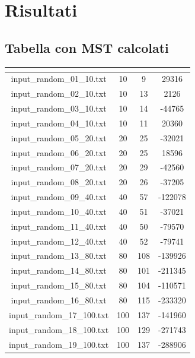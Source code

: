 \section{Risultati}

\subsection{Tabella con MST calcolati}
	
	\renewcommand{\arraystretch}{1.5}
	\begin{longtable}{|c|c|c|c|}
		\hline
		\rowcolor{title_row}
		\textbf{\color{title_text}{Input file}} &
		\textbf{\color{title_text}{num\_vertici}} & \textbf{\color{title_text}{num\_archi}} & \textbf{\color{title_text}{MST}}\\
		\hline
		\endhead
		input\_random\_01\_10.txt & 10 & 9 & 29316 \\ \hline 
		input\_random\_02\_10.txt & 10 & 13 & 2126 \\ \hline 
		input\_random\_03\_10.txt & 10 & 14 & -44765 \\ \hline
		input\_random\_04\_10.txt & 10 & 11 & 20360 \\ \hline
		input\_random\_05\_20.txt & 20 & 25 & -32021 \\ \hline
		input\_random\_06\_20.txt & 20 & 25 & 18596 \\ \hline
		input\_random\_07\_20.txt & 20 & 29 & -42560 \\ \hline
		input\_random\_08\_20.txt & 20 & 26 & -37205 \\ \hline
		input\_random\_09\_40.txt & 40 & 57 & -122078 \\ \hline
		input\_random\_10\_40.txt & 40 & 51 & -37021 \\ \hline
		input\_random\_11\_40.txt & 40 & 50 & -79570 \\ \hline
		input\_random\_12\_40.txt & 40 & 52 & -79741 \\ \hline
		input\_random\_13\_80.txt & 80 & 108 & -139926 \\ \hline
		input\_random\_14\_80.txt & 80 & 101 & -211345 \\ \hline
		input\_random\_15\_80.txt & 80 & 104 & -110571 \\ \hline
		input\_random\_16\_80.txt & 80 & 115 & -233320 \\ \hline
		input\_random\_17\_100.txt & 100 & 137 & -141960 \\ \hline
		input\_random\_18\_100.txt & 100 & 129 & -271743 \\ \hline
		input\_random\_19\_100.txt & 100 & 137 & -288906 \\ \hline

\end{longtable}
